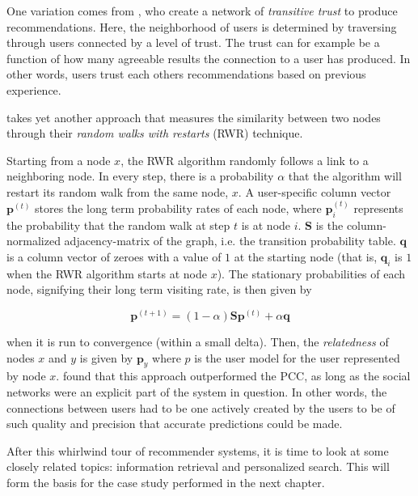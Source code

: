 One variation comes from \cite{Walter2008}, who create a network of \emph{transitive trust} to produce recommendations. Here,
the neighborhood of users is determined by traversing through users connected by a level of trust. 
The trust can for example be a function of how many agreeable results the connection to a user has produced.
In other words, users trust each others recommendations based on previous experience.

\cite{Konstas} takes yet another approach that measures the similarity between two nodes through their \emph{random walks with restarts} (RWR) technique.

Starting from a node $x$, the RWR algorithm randomly follows a link to a neighboring node. 
In every step, there is a probability $\alpha$ that the algorithm will restart its random walk from the same node, $x$. 
A user-specific column vector $\mathbf{p}^{(t)}$ stores the long term probability rates of each node, 
where $\mathbf{p}^{(t)}_i$ represents the probability that the random walk at step $t$ is at node $i$. 
$\mathbf{S}$ is the column-normalized adjacency-matrix of the graph, i.e. the transition probability table. 
$\mathbf{q}$ is a column vector of zeroes with a value of $1$ at the starting node (that is, $\mathbf{q}_i$ is $1$ when the RWR algorithm starts at node $x$). 
The stationary probabilities of each node, signifying their long term visiting rate, is then given by 

\begin{equation*}
  \mathbf{p}^{(t+1)} = (1 - \alpha)\mathbf{S}\mathbf{p}^{(t)} + {\alpha}\mathbf{q}
\end{equation*}

when it is run to convergence (within a small delta). Then, the \emph{relatedness} of nodes $x$ and $y$ is given by $\mathbf{p}_y$ where $p$ is the user model for the user represented by node $x$.
\citeauthor{Konstas} found that this approach outperformed the PCC, as long as the social networks were an explicit part of the system in question.
In other words, the connections between users had to be one actively created by the users to be of such quality and precision that
accurate predictions could be made.

After this whirlwind tour of recommender systems, it is time to look at some closely related topics:
information retrieval and personalized search. This will form the basis for the case study
performed in the next chapter.

